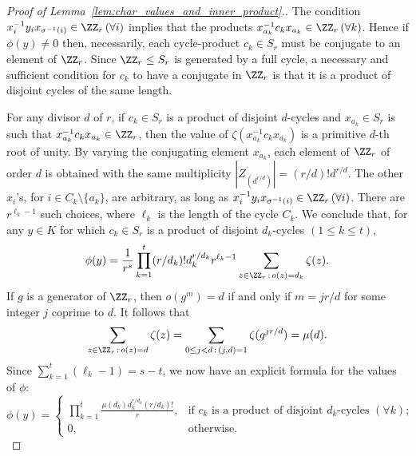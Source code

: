 \begin{proof}[Proof of  Lemma~\ref{lem:char_values_and_inner_product}.]
    The condition $x_i^{-1}y_ix_{\sigma^{-1}(i)} \in \ZZ_r\, (\forall i)$ implies that the products $x_{a_k}^{-1}c_kx_{a_k}\in \ZZ_r\, (\forall k)$. 
    Hence if $\phi(y) \ne 0$ then, necessarily, each cycle-product $c_k \in S_r$ must be conjugate to an element of $\ZZ_r$.
    Since $\ZZ_r \le S_r$ is generated by a full cycle, 
    a necessary and sufficient condition for $c_k$ to have a conjugate in $\ZZ_r$ is that it is a product of disjoint cycles of the same length.

    For any divisor $d$ of $r$,
    if $c_k \in S_r$ is a product of disjoint $d$-cycles
    and $x_{a_k} \in S_r$ is such that $x_{a_k}^{-1}c_kx_{a_k} \in \ZZ_r$, 
    then the value of $\zeta(x_{a_k}^{-1}c_kx_{a_k})$ is a primitive $d$-th root of unity. By varying the conjugating element $x_{a_k}$, each element of $\ZZ_r$ of order $d$ is obtained with the same multiplicity $|Z_{(d^{r/d})}| = (r/d)! d^{r/d}$.  
    The other $x_i$'s, for $i \in C_k \setminus \{a_k\}$, are arbitrary, as long as $x_i^{-1}y_ix_{\sigma^{-1}(i)}\in \ZZ_r\,(\forall i)$. There are $r^{\ell_k - 1}$ such choices, where $\ell_k$ is the length of the cycle $C_k$.
    We conclude that, for any $y \in K$ for which $c_k \in S_r$ is a product of disjoint $d_k$-cycles $(1 \le k \le t)$,
    \[
        \phi(y) = \frac{1}{r^s} \prod_{k=1}^{t} 
        (r/d_k)! d_k^{r/d_k} r^{\ell_k - 1} 
        \sum_{z \in \ZZ_r \,:\, o(z) = d_k} \zeta(z).
    \]
    If $g$ is a generator of $\ZZ_r$, then $o(g^m) = d$ if and only if $m = jr/d$ for some integer $j$ coprime to $d$. 
    It follows that
    \[
        \sum_{z \in \ZZ_r \,:\, o(z) = d} \zeta(z) 
        = \sum_{0 \le j < d \,:\, (j,d) = 1} \zeta(g^{jr/d})
        = \mu(d).
    \]
    Since $\sum_{k=1}^{t} (\ell_k - 1) = s-t$,
    we now have an explicit formula for the values of $\phi$:
    \begin{equation}\label{eq:char_value}
	   \phi(y) =
	   \begin{cases}\displaystyle
	       \prod_{k=1}^{t} \frac{\mu(d_k) d_k^{r/d_k} (r/d_k)!}{r}, 
	       &\text{if } c_k \text{ is a product of disjoint } d_k \text{-cycles } (\forall k); \\
	       0, &\text{otherwise.}
	   \end{cases}
    \end{equation}


\end{proof}
